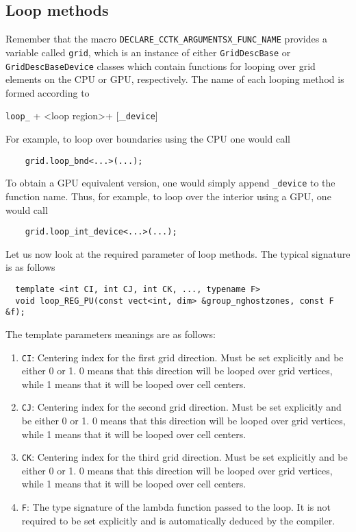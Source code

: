 
\subsection{Loop methods}
\label{sec:loop_methods}

Remember that the macro \texttt{DECLARE\_CCTK\_ARGUMENTSX\_FUNC\_NAME} provides a variable called \texttt{grid}, which is an instance of either \texttt{GridDescBase} or \texttt{GridDescBaseDevice} classes which contain functions for looping over grid elements on the CPU or GPU, respectively. The name of each looping method is formed according to
%
\begin{center}
    \texttt{loop\_} + \textless loop region\textgreater + [\_\texttt{device}]
\end{center}

For example, to loop over boundaries using the CPU one would call
%
\begin{lstlisting}
    grid.loop_bnd<...>(...);
\end{lstlisting}
%
To obtain a GPU equivalent version, one would simply append \texttt{\_device} to the function name. Thus, for example, to loop over the interior using a GPU, one would call 

\begin{lstlisting}
    grid.loop_int_device<...>(...);
\end{lstlisting}

Let us now look at the required parameter of loop methods. The typical signature is as follows

\begin{lstlisting}
  template <int CI, int CJ, int CK, ..., typename F>
  void loop_REG_PU(const vect<int, dim> &group_nghostzones, const F &f);
\end{lstlisting}

The template parameters meanings are as follows:

\begin{enumerate}
  \item \texttt{CI}: Centering index for the first grid direction. Must be set explicitly and be either 0 or 1. 0 means that this direction will be looped over grid vertices, while 1 means that it will be looped over cell centers.
  \item \texttt{CJ}: Centering index for the second grid direction. Must be set explicitly and be either 0 or 1. 0 means that this direction will be looped over grid vertices, while 1 means that it will be looped over cell centers.
  \item \texttt{CK}: Centering index for the third grid direction. Must be set explicitly and be either 0 or 1. 0 means that this direction will be looped over grid vertices, while 1 means that it will be looped over cell centers.
  \item \texttt{F}: The type signature of the lambda function passed to the loop. It is not required to be set explicitly and is automatically deduced by the compiler.
\end{enumerate}


